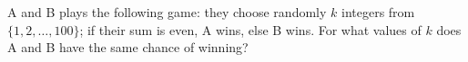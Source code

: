 A and B plays the following game: they choose randomly $k$ integers from $\{1,2,\dots,100\}$; if their sum is even, A wins, else B wins. For what values of $k$ does A and B have the same chance of winning?